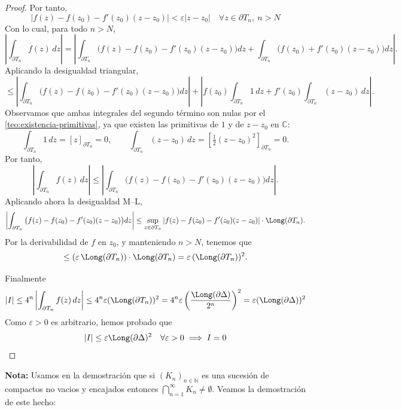 \begin{proof}
    Por tanto, 
    \[
        \left| f(z) - f(z_0) - f'(z_0)(z - z_0) \right| < \varepsilon |z - z_0| \quad \forall z \in \partial T_n, \ n > N
    \]
    Con lo cual, para todo $n > N$,
    \[
        \left| \int_{\partial T_n} f(z) \, dz \right|
        = \left| \int_{\partial T_n} \big( f(z) - f(z_0) - f'(z_0)(z - z_0) \big) dz 
        + \int_{\partial T_n} \big( f(z_0) + f'(z_0)(z - z_0) \big) dz \right|.
    \]
    Aplicando la desigualdad triangular,
    \[
        \leq \left| \int_{\partial T_n} \big( f(z) - f(z_0) - f'(z_0)(z - z_0) \big) dz \right|
        + \left| f(z_0) \int_{\partial T_n} 1 \, dz + f'(z_0) \int_{\partial T_n} (z - z_0) \, dz \right|.
    \]
    Observamos que ambas integrales del segundo término son nulas por el \cref{teo:existencia-primitivas}, ya que existen las primitivas de $1$ y de $z - z_0$ en $\mathbb{C}$:
    \[
        \int_{\partial T_n} 1 \, dz = [z]_{\partial T_n} = 0, 
        \qquad 
        \int_{\partial T_n} (z - z_0) \, dz = \left[ \tfrac{1}{2}(z - z_0)^2 \right]_{\partial T_n} = 0.
    \]
    Por tanto,
    \[
        \left| \int_{\partial T_n} f(z) \, dz \right|
        \leq \left| \int_{\partial T_n} \big( f(z) - f(z_0) - f'(z_0)(z - z_0) \big) dz \right|.
    \]
    Aplicando ahora la desigualdad M–L,
    \[
        \left| \int_{\partial T_n} \big( f(z) - f(z_0) - f'(z_0)(z - z_0) \big) dz \right|
        \leq \sup_{z \in \partial T_n} \left| f(z) - f(z_0) - f'(z_0)(z - z_0) \right|
        \cdot \Long(\partial T_n).
    \]
    Por la derivabilidad de $f$ en $z_0$, y manteniendo $n > N$, tenemos que
    \[
        \leq (\varepsilon \, \Long(\partial T_n)) \cdot \Long(\partial T_n)
        = \varepsilon \, (\Long(\partial T_n))^2.
    \]
    
    Finalmente
    \[
        |I| \leq 4^n \left| \int_{\partial T_n} f(z) \, dz \right| \leq 4^n \varepsilon (\Long(\partial T_n))^2 = 4^n \varepsilon \left( \frac{\Long(\partial \Delta)}{2^n} \right)^2 = \varepsilon (\Long(\partial \Delta))^2 
    \]
    Como $\varepsilon > 0$ es arbitrario, hemos probado que
    \[
        |I| \leq \varepsilon \Long(\partial \Delta)^2 \quad \forall \varepsilon > 0 \implies I = 0
    \]
\end{proof}

\textbf{Nota: } Usamos en la demostración que si $(K_n)_{n \in \mathbb{N}}$ es una sucesión de compactos no vacios y encajados entonces $\bigcap_{n=1}^{\infty} K_n \neq \emptyset$. Veamos la demostración de este hecho:

